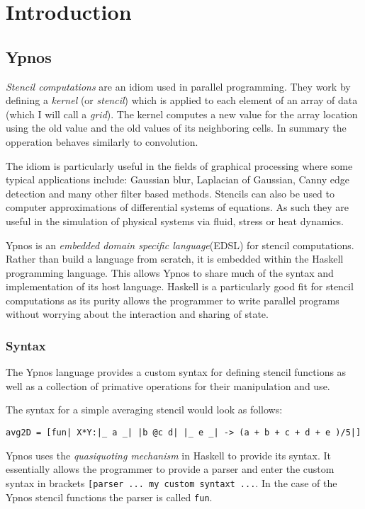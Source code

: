 \section{Introduction}

\subsection{Ypnos}

\emph{Stencil computations} are an idiom used in parallel programming.
They work by defining a \emph{kernel} (or \emph{stencil}) which is
applied to each element of an array of data (which I will call a
\emph{grid}). The kernel computes a new value for the array location
using the old value and the old values of its neighboring cells. In
summary the opperation behaves similarly to convolution.

The idiom is particularly useful in the fields of graphical processing
where some typical applications include: Gaussian blur, Laplacian of
Gaussian, Canny edge detection and many other filter based methods.
Stencils can also be used to computer approximations of differential
systems of equations. As such they are useful in the simulation of
physical systems via fluid, stress or heat dynamics.

Ypnos is an \emph{embedded domain specific language}(EDSL) for stencil
computations. Rather than build a language from scratch, it is embedded
within the Haskell programming language. This allows Ypnos to share much
of the syntax and implementation of its host language. Haskell is a
particularly good fit for stencil computations as its purity allows the
programmer to write parallel programs without worrying about the
interaction and sharing of state.

\subsubsection{Syntax}

The Ypnos language provides a custom syntax for defining stencil
functions as well as a collection of primative operations for their
manipulation and use.

The syntax for a simple averaging stencil would look as follows:

\begin{verbatim}
avg2D = [fun| X*Y:|_ a _| |b @c d| |_ e _| -> (a + b + c + d + e )/5|]
\end{verbatim}

Ypnos uses the \emph{quasiquoting mechanism} in Haskell to provide its
syntax. It essentially allows the programmer to provide a parser and
enter the custom syntax in brackets
\texttt{{[}parser\textbar{} ... my custom syntaxt ...\textbar{}{]}}. In
the case of the Ypnos stencil functions the parser is called
\texttt{fun}.

